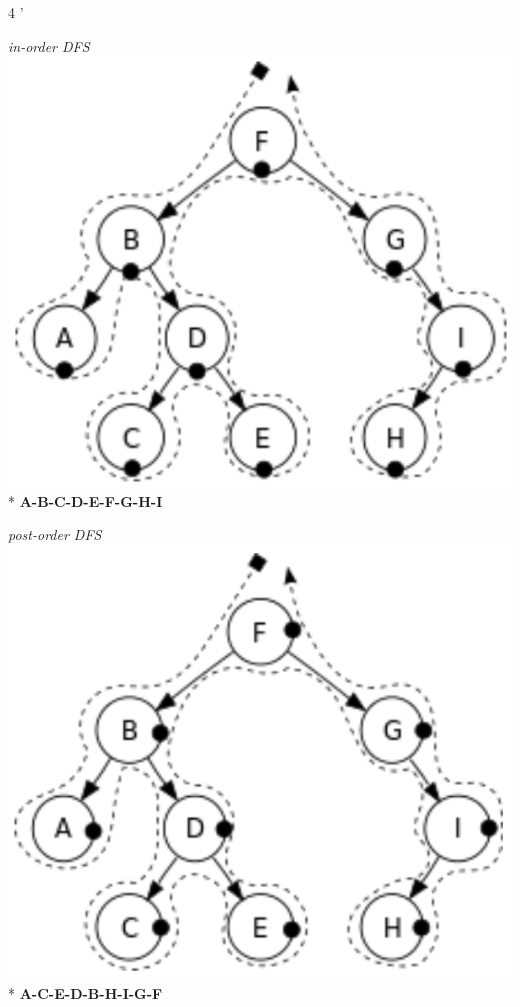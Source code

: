 \documentclass[10pt, landscape]{article}
\begin{document}
\begin{multicols}{4
    '}
\begin{center}
\begin{multicols}{3}
        \textit{in-order DFS}
        \includegraphics[width=0.9\linewidth]{cs1231s-ch11-inorder}
        \\* {\tiny\textbf{A-B-C-D-E-F-G-H-I}}
        
        \textit{post-order DFS}
        \includegraphics[width=0.9\linewidth]{cs1231s-ch11-postorder}
        \\* {\tiny\textbf{A-C-E-D-B-H-I-G-F}}
    \end{multicols}
\end{center}


\end{multicols}
\end{document}
